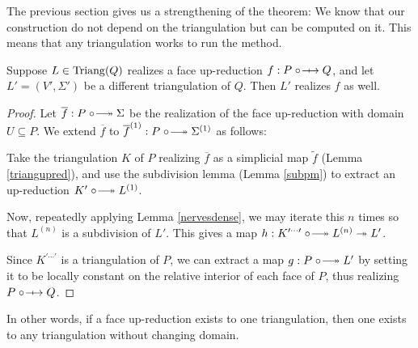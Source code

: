 The previous section gives us a strengthening of the theorem: We know that our construction do not depend on the triangulation but can be computed on it. 
This means that any triangulation works to run the method.


\begin{lemma}
    Suppose $L\in\operatorname{Triang}(Q)$ realizes a face up-reduction $f:P\fupred Q$, and let $L'=(V',\Sigma')$ be a different triangulation of $Q$. Then $L'$ realizes $f$ as well.
\end{lemma}
\begin{proof}
    Let $\overline{f}:P\upred\Sigma$ be the realization of the face up-reduction with domain $U\subseteq P$. We extend $\overline f$ to $\overline f^{(1)}:P\upred\Sigma^{(1)}$ as follows:

    Take the triangulation $K$ of $P$ realizing $\overline f$ as a simplicial map $\tilde{f}$ (Lemma \ref{triangupred}), and use the subdivision lemma (Lemma \ref{subpm}) to extract an up-reduction $K'\upred L^{(1)}$.

    Now, repeatedly applying Lemma \ref{nervesdense}, we may iterate this $n$ times so that $L^{(n)}$ is a subdivision of $L'$. This gives a map $h: K^{\prime \cdots\prime }\upred L^{(n)}\twoheadrightarrow L'$.

    Since $K^{\prime \cdots\prime }$ is a triangulation of $P$, we can extract a map $g:P\upred L'$ by setting it to be locally constant on the relative interior of each face of $P$, thus realizing $P\fupred Q$.
\end{proof}

In other words, if a face up-reduction exists to one triangulation, then one exists to any triangulation without changing domain.
